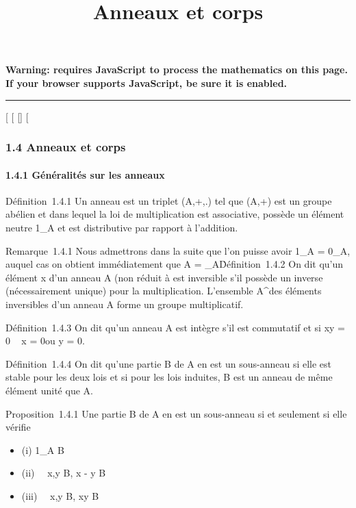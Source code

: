 \documentclass[]{article}
\title{Anneaux et corps}
\author{}
\date{}
\begin{document}
\maketitle

\textbf{Warning: 
requires JavaScript to process the mathematics on this page.\\ If your
browser supports JavaScript, be sure it is enabled.}

\begin{center}\rule{3in}{0.4pt}\end{center}

{[}
{[}
{[}{]}
{[}

\subsubsection{1.4 Anneaux et corps}

\paragraph{1.4.1 Généralités sur les anneaux}

Définition~1.4.1 Un anneau est un triplet (A,+,.) tel que (A,+) est un
groupe abélien et dans lequel la loi de multiplication est associative,
possède un élément neutre 1\_A et est distributive par rapport à
l'addition.

Remarque~1.4.1 Nous admettrons dans la suite que l'on puisse avoir
1\_A = 0\_A, auquel cas on obtient immédiatement que A =
\0\_A\.

Définition~1.4.2 On dit qu'un élément x d'un anneau A (non réduit à
\0\) est inversible s'il possède un
inverse (nécessairement unique) pour la multiplication. L'ensemble
A^\times des éléments inversibles d'un anneau A forme un groupe
multiplicatif.

Définition~1.4.3 On dit qu'un anneau A est intègre s'il est commutatif
et si xy = 0 \rigtharrow~ x = 0\text ou y = 0.

Définition~1.4.4 On dit qu'une partie B de A en est un sous-anneau si
elle est stable pour les deux lois et si pour les lois induites, B est
un anneau de même élément unité que A.

Proposition~1.4.1 Une partie B de A en est un sous-anneau si et
seulement si elle vérifie

\begin{itemize}
\itemsep1pt\parskip0pt
\item
  (i) 1\_A \in B
\item
  (ii) \forall~~x,y \in B, x - y \in B
\item
  (iii) \forall~~x,y \in B, xy \in B
\end{itemize}
\end{document}
